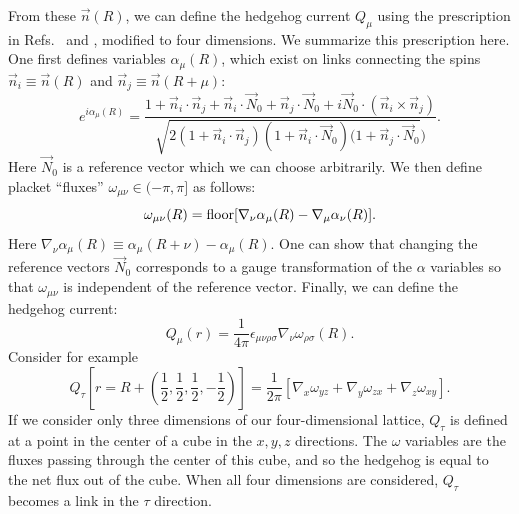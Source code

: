 \documentclass[prb,twocolumn]{revtex4-1}
\begin{document}
From these ${\vec{n}(R)}$, we can define the hedgehog current $Q_\mu$ using the prescription in Refs.~ and , modified to four dimensions. We summarize this prescription here. One first defines variables $\alpha_\mu(R)$, which exist on links connecting the spins $\vec{n}_i\equiv\vec n(R)$ and $\vec{n}_j\equiv\vec n(R+\mu)$:
\begin{equation}
e^{i\alpha_{\mu}(R)}=\frac{1+\vec{n}_i\cdot\vec{n}_j+\vec{n}_i\cdot\vec{N}_0+\vec{n}_j\cdot\vec{N}_0+i\vec{N}_0 \cdot(\vec{n}_i\times\vec{n}_j)}{\sqrt{2(1+\vec{n}_i\cdot\vec{n}_j)(1+\vec{n}_i\cdot\vec{N}_0)(1+\vec{n}_j\cdot\vec{N}_0})}.
\label{alpha}
\end{equation}
Here $\vec{N}_0$ is a reference vector which we can choose arbitrarily. 
We then define placket ``fluxes'' $\omega_{\mu\nu}\in (-\pi,\pi]$ as follows:
\begin{equation}
\omega_{\mu\nu}(R)={\rm floor}[\nabla_\nu\alpha_\mu(R)-\nabla_\mu\alpha_\nu(R)].
\label{omega}
\end{equation}
Here $\nabla_\nu \alpha_\mu(R)\equiv \alpha_\mu(R+\nu)-\alpha_\mu(R)$. One can show that changing the reference vectors $\vec{N}_0$ corresponds to a gauge transformation of the $\alpha$ variables so that $\omega_{\mu\nu}$ is independent of the reference vector. Finally, we can define the hedgehog current:
\begin{equation}
Q_\mu(r)=\frac{1}{4\pi}\epsilon_{\mu\nu\rho\sigma}\nabla_{\nu} \omega_{\rho\sigma}(R).
\label{monopoledef}
\end{equation}
Consider for example 
\begin{equation}
Q_\tau[r=R+(\frac{1}{2},\frac{1}{2},\frac{1}{2},-\frac{1}{2})]=\frac{1}{2\pi}[\nabla_x\omega_{yz}+\nabla_y\omega_{zx}+\nabla_z\omega_{xy}].
\end{equation}
If we consider only three dimensions of our four-dimensional lattice, $Q_\tau$ is defined at a point in the center of a cube in the $x,y,z$ directions. The $\omega$ variables are the fluxes passing through the center of this cube, and so the hedgehog is equal to the net flux out of the cube.
When all four dimensions are considered, $Q_\tau$ becomes a link in the $\tau$ direction.  
\end{document}
